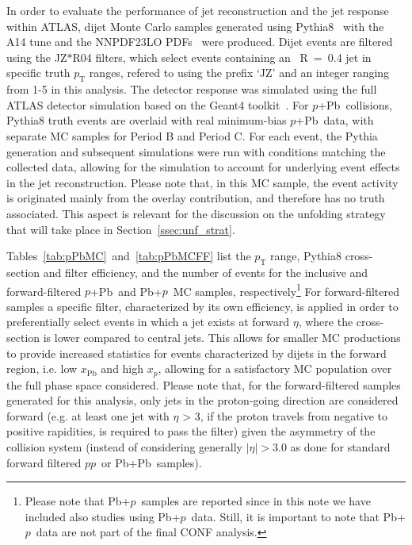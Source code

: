 \documentclass[NOTE, atlasdraft=true, texlive=2020, UKenglish]{atlasdoc}
\newcommand{\PT}{$p_{\text{T}}$}
\newcommand{\pxp}{$pp$}
\newcommand{\pxPb}{$p$+Pb}
\newcommand{\Pbxp}{Pb+$p$}
\newcommand{\PbxPb}{Pb+Pb}
\newcommand{\TN}[1]{ \text{#1} }
\begin{document}
In order to evaluate the performance of jet reconstruction and the jet response within ATLAS, dijet Monte Carlo samples generated using Pythia8~\cite{Sjostrand:2014zea} with the A14 tune and the NNPDF23LO PDFs~\cite{BALL2013244} were produced. Dijet events are filtered using the JZ$*$R04 filters, which select events containing an \antikt\ R~=~0.4 jet in specific truth \PT{} ranges, refered to using the prefix `JZ' and an integer ranging from 1-5 in this analysis. 
The detector response was simulated using the full ATLAS detector simulation based on the Geant4 toolkit~\cite{AGOSTINELLI2003250}. For \pxPb\ collisions, Pythia8 truth events are overlaid with real minimum-bias \pxPb\ data, with separate MC samples for Period B and Period C. For each event, the Pythia generation and subsequent simulations were run with conditions matching the collected data, allowing for the simulation to account for underlying event effects in the jet reconstruction. Please note that, in this MC sample, the event activity is originated mainly from the overlay contribution, and therefore has no truth associated. This aspect is relevant for the discussion on the unfolding strategy that will take place in Section~\ref{ssec:unf_strat}. 

Tables~\ref{tab:pPbMC}~and~\ref{tab:pPbMCFF} list the \PT{} range, Pythia8 cross-section and filter efficiency, and the number of events for the inclusive and forward-filtered \pxPb\ and  \Pbxp\ MC samples, respectively\footnote{Please note that \Pbxp\ samples are reported since in this note we have included also studies using \Pbxp\ data. Still, it is important to note that \Pbxp\ data are not part of the final CONF analysis.}
For forward-filtered samples a specific filter, characterized by its own efficiency, is applied in order to preferentially select events in which a jet exists at forward $\eta$, where the cross-section is lower compared to central jets. This allows for smaller MC productions to provide increased statistics for events characterized by dijets in the forward region, i.e. low $x_{\TN{Pb}}$ and high $x_p$, allowing for a satisfactory MC population over the full phase space considered. Please note that, for the forward-filtered samples generated for this analysis, only jets in the proton-going direction are considered forward (e.g. at least one jet with $\eta$ > 3, if the proton travels from negative to positive rapidities, is required to pass the filter) given the asymmetry of the collision system (instead of considering generally $|\eta| > 3.0$ as done for standard forward filtered \pxp\ or \PbxPb\ samples). 
\end{document}
